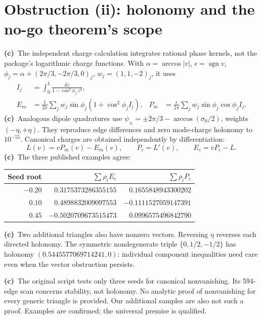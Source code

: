 \documentclass[11pt,a4paper]{article}
\newcommand{\Lc}{\textbf{(c)}\ }
\begin{document}
\section{Obstruction (ii): holonomy and the no-go theorem's scope}
\Lc The independent charge calculation integrates rational phase kernels,
not the package's logarithmic charge functions. With
$\alpha=\arccos|v|$, $\epsilon=\operatorname{sgn}v$,
$\phi_j=\alpha+(2\pi/3,-2\pi/3,0)_j$, $w_j=(1,1,-2)_j$, it uses
\begin{align}
 I_j&=\int_0^1\frac{dz}{1-\cos^2\phi_j\,z^2},\\
 E_m&=\frac1{2\pi}\sum_j w_j\sin\phi_j(1+\cos^2\phi_j I_j),&
 P_m&=\frac\epsilon{2\pi}\sum_j w_j\sin\phi_j\cos\phi_j I_j.
\end{align}
\Lc Analogous dipole quadratures use
$\psi_\pm=\pm2\pi/3-\arccos(\sigma_0/2)$, weights $(-\eta,+\eta)$.
They reproduce edge differences and zero mode-charge holonomy to $10^{-55}$.
Canonical charges are obtained independently by differentiation:
\begin{equation}
 L(v)=vP_m(v)-E_m(v),\qquad P_c=L'(v),\qquad E_c=vP_c-L.
\end{equation}
\Lc The three published examples agree:
\begin{center}
\begin{tabular}{rrr}\toprule
Seed root & $\sum\rho_iE_c$ & $\sum\rho_iP_c$\\\midrule
$-0.20$ & $0.3175373286355155$ & $0.1655848943300202$\\
$0.10$ & $0.4898832009097553$ & $-0.1111527059147391$\\
$0.45$ & $-0.5020709673515473$ & $0.0996575496842790$\\\bottomrule
\end{tabular}
\end{center}
\Lc Two additional triangles also have nonzero vectors. Reversing $\eta$
reverses each directed holonomy. The symmetric nondegenerate triple
$\{0,1/2,-1/2\}$ has holonomy $(0.5445577069714241,0)$: individual component
inequalities need care even when the vector obstruction persists.

\Lc The original script tests only three seeds for canonical nonvanishing.
Its 594-edge scan concerns stability, not holonomy. No analytic proof of
nonvanishing for every generic triangle is provided. Our additional samples
are also not such a proof. Examples are confirmed; the universal premise is
qualified.
\end{document}
